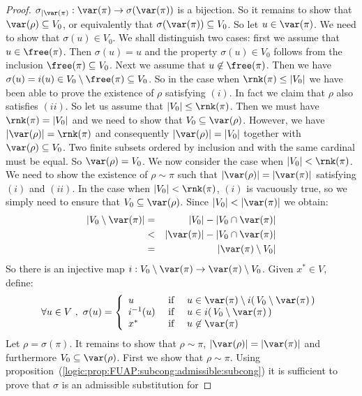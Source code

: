 \begin{proof}
$\sigma_{|\var(\pi)}:\var(\pi)\to\sigma(\var(\pi))$ is a bijection.
So it remains to show that $\var(\rho)\subseteq V_{0}$, or
equivalently that $\sigma(\var(\pi))\subseteq V_{0}$. So let
$u\in\var(\pi)$. We need to show that $\sigma(u)\in V_{0}$. We shall
distinguish two cases: first we assume that $u\in\free(\pi)$. Then
$\sigma(u)=u$ and the property $\sigma(u)\in V_{0}$ follows from the
inclusion $\free(\pi)\subseteq V_{0}$. Next we assume that
$u\not\in\free(\pi)$. Then we have $\sigma(u)=i(u)\in
V_{0}\setminus\free(\pi)\subseteq V_{0}$. So in the case when
$\rnk(\pi)\leq|V_{0}|$ we have been able to prove the existence of
$\rho$ satisfying $(i)$. In fact we claim that $\rho$ also satisfies
$(ii)$. So let us assume that $|V_{0}|\leq\rnk(\pi)$. Then we must
have $\rnk(\pi)=|V_{0}|$ and we need to show that
$V_{0}\subseteq\var(\rho)$. However, we have
$|\var(\rho)|=\rnk(\pi)$ and consequently $|\var(\rho)|=|V_{0}|$
together with $\var(\rho)\subseteq V_{0}$. Two finite subsets
ordered by inclusion and with the same cardinal must be equal. So
$\var(\rho)=V_{0}$. We now consider the case when
$|V_{0}|<\rnk(\pi)$. We need to show the existence of $\rho\sim\pi$
such that $|\var(\rho)|=|\var(\pi)|$ satisfying $(i)$ and $(ii)$. In
the case when $|V_{0}|<\rnk(\pi)$, $(i)$ is vacuously true, so we
simply need to ensure that $V_{0}\subseteq\var(\rho)$. Since
$|V_{0}|<|\var(\pi)|$ we obtain:
    \begin{eqnarray*}
    |V_{0}\setminus\var(\pi)|&=&|V_{0}|-|V_{0}\cap\var(\pi)|\\
    &<&|\var(\pi)|-|V_{0}\cap\var(\pi)|\\
    &=&|\var(\pi)\setminus V_{0}|
    \end{eqnarray*}
So there is an injective map
$i:V_{0}\setminus\var(\pi)\to\var(\pi)\setminus V_{0}$. Given
$x^{*}\in V$, define:
    \[
    \forall u\in V\ ,\ \sigma(u)=\left\{
        \begin{array}{lcl}
        u&\mbox{\ if\ }&u\in\var(\pi)\setminus i(\,V_{0}\setminus\var(\pi)\,)\\
        i^{-1}(u)&\mbox{\ if\ }&u\in i(\,V_{0}\setminus\var(\pi)\,)\\
        x^{*}&\mbox{\ if\ }&u\not\in\var(\pi)
        \end{array}
    \right.
    \]
Let $\rho=\sigma(\pi)$. It remains to show that $\rho\sim\pi$,
$|\var(\rho)|=|\var(\pi)|$ and furthermore
$V_{0}\subseteq\var(\rho)$. First we show that $\rho\sim\pi$. Using
proposition~(\ref{logic:prop:FUAP:subcong:admissible:subcong}) it is
sufficient to prove that $\sigma$ is an admissible substitution for

\end{proof}
